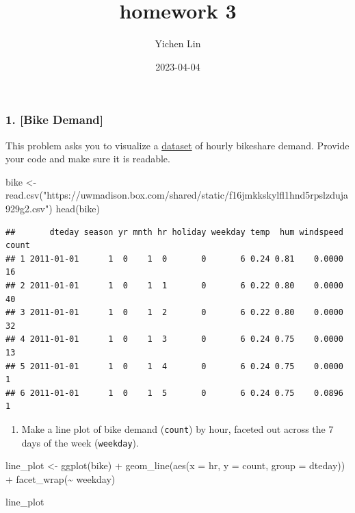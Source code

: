 \documentclass[
]{article}
\title{homework 3}
\author{Yichen Lin}
\date{2023-04-04}
\newenvironment{Shaded}{\begin{snugshade}}{\end{snugshade}}
\newcommand{\AttributeTok}[1]{\textcolor[rgb]{0.77,0.63,0.00}{#1}}
\newcommand{\FunctionTok}[1]{\textcolor[rgb]{0.00,0.00,0.00}{#1}}
\newcommand{\NormalTok}[1]{#1}
\newcommand{\OtherTok}[1]{\textcolor[rgb]{0.56,0.35,0.01}{#1}}
\newcommand{\SpecialCharTok}[1]{\textcolor[rgb]{0.00,0.00,0.00}{#1}}
\newcommand{\StringTok}[1]{\textcolor[rgb]{0.31,0.60,0.02}{#1}}
\providecommand{\tightlist}{%
  \setlength{\itemsep}{0pt}\setlength{\parskip}{0pt}}
\begin{document}
\maketitle

\hypertarget{bike-demand}{%
\subsubsection{1. {[}Bike Demand{]}}\label{bike-demand}}

This problem asks you to visualize a
\href{https://uwmadison.box.com/shared/static/f16jmkkskylfl1hnd5rpslzduja929g2.csv}{dataset}
of hourly bikeshare demand. Provide your code and make sure it is
readable.

\begin{Shaded}
\begin{Highlighting}[]
\NormalTok{bike }\OtherTok{\textless{}{-}} \FunctionTok{read.csv}\NormalTok{(}\StringTok{"https://uwmadison.box.com/shared/static/f16jmkkskylfl1hnd5rpslzduja929g2.csv"}\NormalTok{)}
\FunctionTok{head}\NormalTok{(bike)}
\end{Highlighting}
\end{Shaded}

\begin{verbatim}
##       dteday season yr mnth hr holiday weekday temp  hum windspeed count
## 1 2011-01-01      1  0    1  0       0       6 0.24 0.81    0.0000    16
## 2 2011-01-01      1  0    1  1       0       6 0.22 0.80    0.0000    40
## 3 2011-01-01      1  0    1  2       0       6 0.22 0.80    0.0000    32
## 4 2011-01-01      1  0    1  3       0       6 0.24 0.75    0.0000    13
## 5 2011-01-01      1  0    1  4       0       6 0.24 0.75    0.0000     1
## 6 2011-01-01      1  0    1  5       0       6 0.24 0.75    0.0896     1
\end{verbatim}

\begin{enumerate}
\def\labelenumi{\alph{enumi}.}
\tightlist
\item
  Make a line plot of bike demand (\texttt{count}) by hour, faceted out
  across the 7 days of the week (\texttt{weekday}).
\end{enumerate}

\begin{Shaded}
\begin{Highlighting}[]
\NormalTok{line\_plot }\OtherTok{\textless{}{-}}  \FunctionTok{ggplot}\NormalTok{(bike) }\SpecialCharTok{+}
  \FunctionTok{geom\_line}\NormalTok{(}\FunctionTok{aes}\NormalTok{(}\AttributeTok{x =}\NormalTok{ hr, }\AttributeTok{y =}\NormalTok{ count, }\AttributeTok{group =}\NormalTok{ dteday)) }\SpecialCharTok{+}
  \FunctionTok{facet\_wrap}\NormalTok{(}\SpecialCharTok{\textasciitilde{}}\NormalTok{ weekday)}

\NormalTok{line\_plot}
\end{Highlighting}
\end{Shaded}
\end{document}
